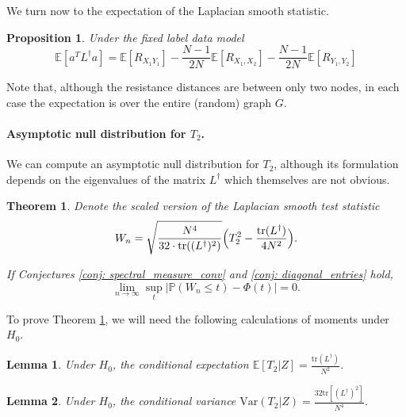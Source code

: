 \documentclass{article}
\newcommand{\Expect}[1]{\mathbb{E}\left[ #1 \right]}
\newcommand{\Var}[1]{\mathrm{Var}\left( #1 \right)}
\newcommand{\Prob}[1]{\mathbb{P}\left( #1 \right)}
\newcommand{\abs}[1]{\left \lvert #1 \right \rvert}
\newcommand{\Linv}{L^{\dagger}}
\newcommand{\tr}{\text{tr}}
\theoremstyle{alden}
\newtheorem{theorem}{Theorem}
\newtheorem{lemma}{Lemma}
\newtheorem{proposition}{Proposition}
\theoremstyle{definition}
\theoremstyle{remark}
\begin{document}
We turn now to the expectation of the Laplacian smooth statistic.
\begin{proposition}
	\label{prop: expectation_of_T2}
	Under the fixed label data model
	\begin{equation}
	\label{eqn: expectation_of_T2}
	\Expect{a^T \Linv a} = \Expect{R_{X_1 Y_1}} - \frac{N - 1}{2N} \Expect{R_{X_1,X_2}} - \frac{N - 1}{2N} \Expect{R_{Y_1, Y_2}}
	\end{equation}
\end{proposition}

Note that, although the resistance distances are between only two nodes, in each case the expectation is over the entire (random) graph $G$. 

\paragraph{Asymptotic null distribution for $T_2$.}

We can compute an asymptotic null distribution for $T_2$, although its formulation depends on the eigenvalues of the matrix $\Linv$ which themselves are not obvious.

\begin{theorem}
	\label{thm: asymptotic_null_distribution}
	Denote the scaled version of the Laplacian smooth test statistic
	\begin{equation*}
	W_n = \sqrt{\frac{N^4}{32 \cdot \tr((\Linv)^2)}}\Bigl(T_2^2 - \frac{\tr(\Linv)}{4N^2} \Bigr).
	\end{equation*}
	
	If Conjectures \ref{conj: spectral_measure_conv} and \ref{conj: diagonal_entries} hold,
	\begin{equation*}
	\lim_{n \to \infty} \sup_{t} \abs{\Prob{W_n \leq t} - \Phi(t)} = 0.
	\end{equation*}
\end{theorem}

To prove Theorem \ref{thm: asymptotic_null_distribution}, we will need the following calculations of moments under $H_0$. 

\begin{lemma}
	\label{lem: cond_expectation_of_T2}
	Under $H_0$, the conditional expectation $\Expect{T_2 \vert Z} = \frac{\tr(\Linv)}{N^2}$. 
\end{lemma}

\begin{lemma}
	\label{lem: cond_var_of_T2}
	Under $H_0$, the conditional variance $\Var{T_2 \vert Z} = \frac{32 \tr[(\Linv)^2]}{N^4}$. 
\end{lemma}
\end{document}
